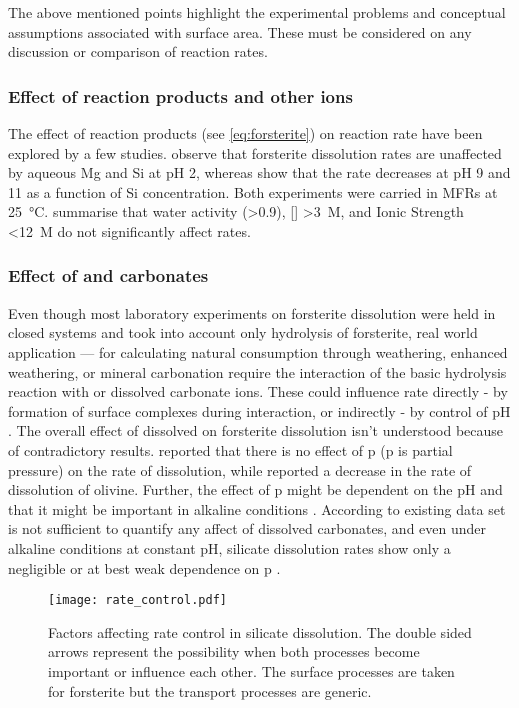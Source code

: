 The above mentioned points highlight the experimental problems and conceptual assumptions associated with surface area. These must be considered on any discussion or comparison of reaction rates.
\subsubsection{Effect of reaction products and other ions}
The effect of reaction products (see \cref{eq:forsterite}) on reaction rate have been explored by a few studies. \cite{oelkers2001a} observe that forsterite dissolution rates are unaffected by aqueous Mg and Si at pH 2, whereas \cite{pokrovsky2000} show that the rate decreases at pH 9 and 11 as a function of Si concentration. Both experiments were carried in MFRs at \SI{25}{\degreeCelsius}. \cite{rimstidt2012} summarise that water activity (\num{>0.9}), [] \SI{>3}{M}, and Ionic Strength \SI{<12}{M} do not significantly affect rates.
\subsubsection{Effect of  and carbonates}
Even though most laboratory experiments on forsterite dissolution were held in closed systems and took into account only hydrolysis of forsterite, real world application --- for calculating natural  consumption through weathering, enhanced weathering, or mineral carbonation require the interaction of the basic hydrolysis reaction with  or dissolved carbonate ions. These could influence rate directly - by formation of surface complexes during interaction, or indirectly - by control of pH \citep{awad2000}. The overall effect of dissolved  on forsterite dissolution isn't understood because of contradictory results. \cite{golubev2005} reported that there is no effect of p (p is partial pressure) on the rate of dissolution, while \cite{wogelius1991} reported a decrease in the rate of dissolution of olivine. Further, the effect of p might be dependent on the pH and that it might be important in alkaline conditions \citep{hanchen2006,wogelius1991}. According to \cite{rimstidt2012} existing data set is not sufficient to quantify any affect of dissolved carbonates, and even under alkaline conditions at constant pH, silicate dissolution rates show only a negligible or at best weak dependence on p \citep{Brantley2008c}. 

\begin{figure}[h]\label{fig:rate_control}
\centering
\texttt{[image: rate\_control.pdf]}
\caption{Factors affecting rate control in silicate dissolution. The double sided arrows represent the possibility when both processes become important or influence each other. The surface processes are taken for forsterite but the transport processes are generic. }
\end{figure}
 
